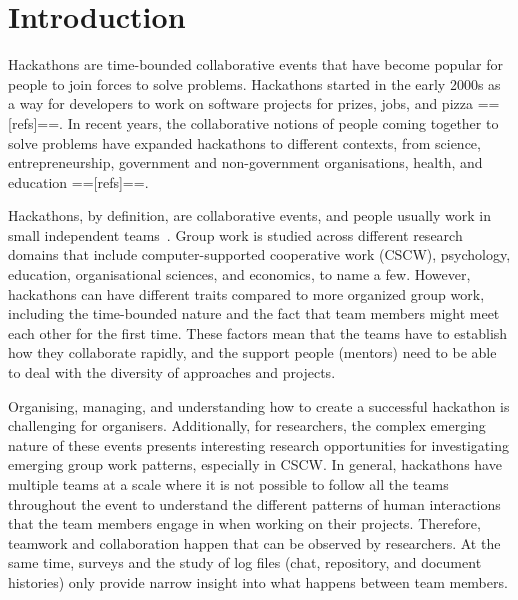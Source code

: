 \documentclass[sigconf,review,anonymous]{acmart}
\begin{document}
\section{Introduction}
Hackathons are time-bounded collaborative events that have become popular for people to join forces to solve problems. Hackathons started in the early 2000s as a way for developers to work on software projects for prizes, jobs, and pizza ==[refs]==. In recent years, the collaborative notions of people coming together to solve problems have expanded hackathons to different contexts, from science, entrepreneurship, government and non-government organisations, health, and education ==[refs]==. 

Hackathons, by definition, are collaborative events, and people usually work in small independent teams~\cite{trainer2016hackathon}. Group work is studied across different research domains that include computer-supported cooperative work (CSCW), psychology, education, organisational sciences, and economics, to name a few. However, hackathons can have different traits compared to more organized group work, including the time-bounded nature and the fact that team members might meet each other for the first time. These factors mean that the teams have to establish how they collaborate rapidly, and the support people (mentors) need to be able to deal with the diversity of approaches and projects. ~\cite{edmondson2012teaming,falk2022supporting}

Organising, managing, and understanding how to create a successful hackathon is challenging for organisers. Additionally, for researchers, the complex emerging nature of these events presents interesting research opportunities for investigating emerging group work patterns, especially in CSCW. In general, hackathons have multiple teams at a scale where it is not possible to follow all the teams throughout the event to understand the different patterns of human interactions that the team members engage in when working on their projects. Therefore, teamwork and collaboration happen that can be observed by researchers. At the same time, surveys and the study of log files (chat, repository, and document histories) only provide narrow insight into what happens between team members. 
\end{document}
